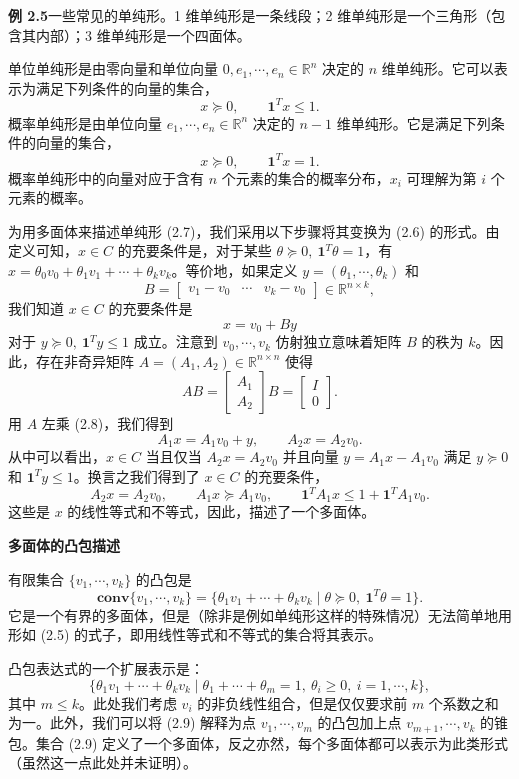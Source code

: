 \documentclass[UTF8,12pt,a4paper,fontset=fandol]{ctexart}
\begin{document}
\noindent\textbf{例 2.5}\quad 一些常见的单纯形。1 维单纯形是一条线段；2 维单纯形是一个三角形（包含其内部）；3 维单纯形是一个四面体。

单位单纯形是由零向量和单位向量 $0,e_1,\cdots,e_n\in\mathbb{R}^n$ 决定的 $n$ 维单纯形。它可以表示为满足下列条件的向量的集合，
\[
  x\succeq 0,\qquad \mathbf{1}^Tx\le 1.
\]
概率单纯形是由单位向量 $e_1,\cdots,e_n\in\mathbb{R}^n$ 决定的 $n-1$ 维单纯形。它是满足下列条件的向量的集合，
\[
  x\succeq 0,\qquad \mathbf{1}^Tx=1.
\]
概率单纯形中的向量对应于含有 $n$ 个元素的集合的概率分布，$x_i$ 可理解为第 $i$ 个元素的概率。

为用多面体来描述单纯形 (2.7)，我们采用以下步骤将其变换为 (2.6) 的形式。由定义可知，$x\in C$ 的充要条件是，对于某些 $\theta\succeq 0,\ \mathbf{1}^T\theta=1$，有 $x=\theta_0v_0+\theta_1v_1+\cdots+\theta_kv_k$。等价地，如果定义 $y=(\theta_1,\cdots,\theta_k)$ 和
\[
  B=\begin{bmatrix} v_1-v_0 & \cdots & v_k-v_0 \end{bmatrix}\in\mathbb{R}^{n\times k},
\]
我们知道 $x\in C$ 的充要条件是
\begin{equation}
  x=v_0+By
  \tag{2.8}
\end{equation}
对于 $y\succeq 0,\ \mathbf{1}^Ty\le 1$ 成立。注意到 $v_0,\cdots,v_k$ 仿射独立意味着矩阵 $B$ 的秩为 $k$。因此，存在非奇异矩阵 $A=(A_1,A_2)\in\mathbb{R}^{n\times n}$ 使得
\[
  AB=
  \begin{bmatrix}
    A_1\\
    A_2
  \end{bmatrix}B
  =
  \begin{bmatrix}
    I\\
    0
  \end{bmatrix}.
\]
用 $A$ 左乘 (2.8)，我们得到
\[
  A_1x=A_1v_0+y,\qquad A_2x=A_2v_0.
\]
从中可以看出，$x\in C$ 当且仅当 $A_2x=A_2v_0$ 并且向量 $y=A_1x-A_1v_0$ 满足 $y\succeq 0$ 和 $\mathbf{1}^Ty\le 1$。换言之我们得到了 $x\in C$ 的充要条件，
\[
  A_2x=A_2v_0,\qquad A_1x\succeq A_1v_0,\qquad \mathbf{1}^TA_1x\le 1+\mathbf{1}^TA_1v_0.
\]
这些是 $x$ 的线性等式和不等式，因此，描述了一个多面体。

\noindent\textbf{多面体的凸包描述}

有限集合 $\{v_1,\cdots,v_k\}$ 的凸包是
\[
  \mathbf{conv}\{v_1,\cdots,v_k\}
  =\{\theta_1v_1+\cdots+\theta_kv_k\mid \theta\succeq 0,\ \mathbf{1}^T\theta=1\}.
\]
它是一个有界的多面体，但是（除非是例如单纯形这样的特殊情况）无法简单地用形如 (2.5) 的式子，即用线性等式和不等式的集合将其表示。

凸包表达式的一个扩展表示是：
\begin{equation}
  \{\theta_1v_1+\cdots+\theta_kv_k\mid \theta_1+\cdots+\theta_m=1,\ \theta_i\ge 0,\ i=1,\cdots,k\},
  \tag{2.9}
\end{equation}
其中 $m\le k$。此处我们考虑 $v_i$ 的非负线性组合，但是仅仅要求前 $m$ 个系数之和为一。此外，我们可以将 (2.9) 解释为点 $v_1,\cdots,v_m$ 的凸包加上点 $v_{m+1},\cdots,v_k$ 的锥包。集合 (2.9) 定义了一个多面体，反之亦然，每个多面体都可以表示为此类形式（虽然这一点此处并未证明）。
\end{document}
